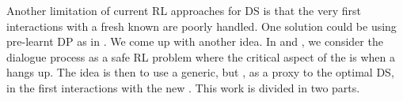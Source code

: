 %
%
Another limitation of current \gls{RL} approaches for \gls{DS} is that the very first interactions with a fresh known  are poorly handled. One solution could be using pre-learnt \acrfull{DP} as in . We come up with another idea. In  and , we consider the dialogue process as a safe \gls{RL} problem where the critical aspect of the  is when a  hangs up. The idea is then to use a generic, but , as a proxy to the optimal \gls{DS}, in the first interactions with the new . This work is divided in two parts.

